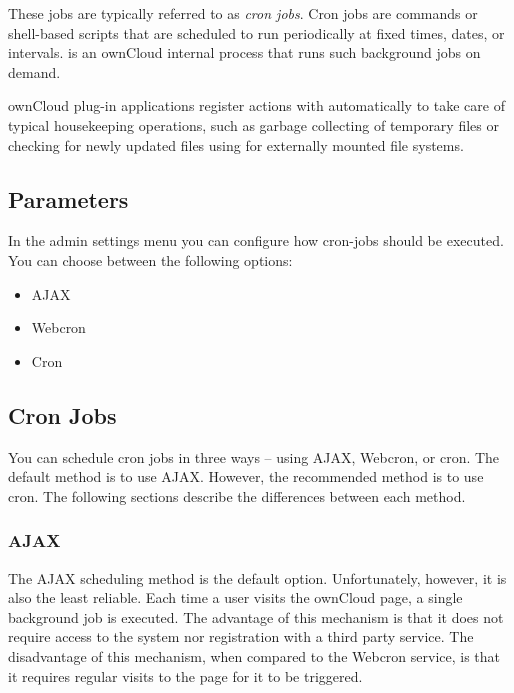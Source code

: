 \documentclass[letterpaper,10pt,english]{sphinxmanual}
\begin{document}
These jobs are typically referred to as \emph{cron jobs}.  Cron jobs are commands or shell-based scripts that are scheduled to run periodically at fixed times, dates, or intervals.    is an ownCloud internal process that runs such background jobs on demand.

ownCloud plug-in applications register actions with  automatically to take care of typical housekeeping operations, such as garbage collecting of temporary files or checking for newly updated files using  for externally mounted file systems.


\subsection{Parameters}
\label{configuration_server/background_jobs_configuration:parameters}
In the admin settings menu you can configure how cron-jobs should be executed.
You can choose between the following options:
\begin{itemize}
\item {} 
AJAX

\item {} 
Webcron

\item {} 
Cron

\end{itemize}


\subsection{Cron Jobs}
\label{configuration_server/background_jobs_configuration:cron-jobs}
You can schedule cron jobs in three ways -- using AJAX, Webcron, or cron. The default method is to use AJAX.  However, the recommended method is to use cron.  The following sections describe the differences between each method.


\subsubsection{AJAX}
\label{configuration_server/background_jobs_configuration:ajax}
The AJAX scheduling method is the default option.  Unfortunately, however, it is also the least reliable. Each time a user visits the ownCloud page, a single background job is executed. The advantage of this mechanism is that it does not require access to the system nor registration with a third party service. The disadvantage of this mechanism, when compared to the Webcron service, is that it requires regular visits to the page for it to be triggered.
\end{document}
